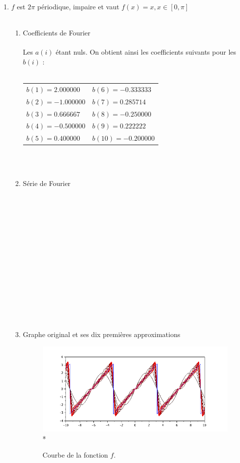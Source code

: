 \documentclass[a4paper,12pt]{report}
\begin{document}
\begin{enumerate}
		\item $f$ est $2\pi$ périodique, impaire et vaut $f(x)=x, x \in [0,\pi]$ \\ \\
		\begin{enumerate}
			\item Coefficients de Fourier \\ \\
			Les $a(i)$ étant nuls. On obtient ainsi les coefficients suivants pour les $b(i)$ : \\ \\
			\begin{tabular}{l l}
				$b(1) = 2.000000$ & \hspace*{2cm}$b(6) = -0.333333$\\
				$b(2) = -1.000000$ & \hspace*{2cm}$b(7) = 0.285714$\\
				$b(3) = 0.666667$ & \hspace*{2cm}$b(8) = -0.250000$\\
				$b(4) = -0.500000$ & \hspace*{2cm}$b(9) = 0.222222$\\
				$b(5) = 0.400000$ & \hspace*{2cm}$b(10) = -0.200000$\\
			\end{tabular}\\ \\
			\item Série de Fourier \\ \\ \\ \\ \\ \\ \\ \\ \\ \\ \\ \\ \\ \\ \\

			\item Graphe original et ses dix premières approximations
			\begin{figure}[h!]
				\centering
				\includegraphics[scale=0.6]{ex1_fig2_1.png}\\*
				\caption{\label{ex1_figure2_1}Courbe de la fonction $f$.}
			\end{figure}\\
		

\end{enumerate}
\end{enumerate}
\end{document}
